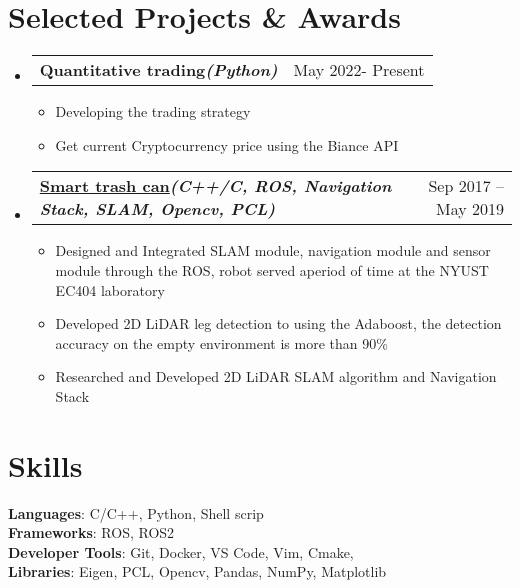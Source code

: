 \documentclass[letterpaper,11pt]{article}
\makeatletter
\newcommand{\resumeItem}[1]{
  \item\small{
    {#1 \vspace{-2pt}}
  }
}
\newcommand{\resumeProjectHeading}[2]{
    \item
    \begin{tabular*}{0.97\textwidth}{l@{\extracolsep{\fill}}r}
      \textbf{#1} & #2 \\
    \end{tabular*}\vspace{-7pt}
}
\newcommand{\resumeSubHeadingListStart}{\begin{itemize}[leftmargin=0.15in, label={}]}
\newcommand{\resumeSubHeadingListEnd}{\end{itemize}}
\newcommand{\resumeItemListStart}{\begin{itemize}}
\newcommand{\resumeItemListEnd}{\end{itemize}\vspace{-5pt}}
\makeatother
\begin{document}
\section{\textbf{Selected Projects \& Awards}}
  \vspace{3pt}
    \resumeSubHeadingListStart

      \resumeProjectHeading
        {Quantitative trading\emph{\scriptsize{(Python)}}}{May 2022- Present}
        \resumeItemListStart
          \resumeItem{Developing the trading strategy}
          \resumeItem{Get current Cryptocurrency price using the Biance API}
        \resumeItemListEnd

      \resumeProjectHeading
        {\href{https://drive.google.com/file/d/1FCTHbe_6uXDAoiZOx13j0Z9KNvcpPl73/view?usp=sharing}{\color{blue}Smart trash can}\emph{\scriptsize{(C++/C, ROS, Navigation Stack, SLAM, Opencv, PCL)}}}{Sep 2017 -- May 2019}
          \resumeItemListStart
            \resumeItem{Designed and Integrated SLAM module, navigation module and sensor module through the ROS, robot served aperiod of time at the NYUST EC404 laboratory}
            \resumeItem{Developed 2D LiDAR leg detection to using the Adaboost, the detection accuracy on the empty environment is more than 90\%}
            \resumeItem{Researched and Developed 2D LiDAR SLAM algorithm and Navigation Stack}
          \resumeItemListEnd
    \resumeSubHeadingListEnd

%
\section{\textbf{Skills}}
 \begin{itemize}[leftmargin=0.15in, label={}]
    \small{\item{
     \textbf{Languages}{: C/C++, Python, Shell scrip} \\
     \textbf{Frameworks}{: ROS, ROS2} \\
     \textbf{Developer Tools}{: Git, Docker, VS Code, Vim, Cmake, } \\
     \textbf{Libraries}{: Eigen, PCL, Opencv, Pandas, NumPy, Matplotlib}
    }}
 \end{itemize}


\end{document}
